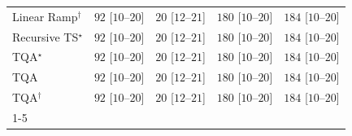 \begin{tabular}{l|cccc|}
Linear Ramp$^\dagger$ & {\cellcolor[HTML]{75C477}} \color[HTML]{000000} $92$ [$10$--$20$] & {\cellcolor[HTML]{E8F6E4}} \color[HTML]{000000} $20$ [$12$--$21$] & {\cellcolor[HTML]{004A1E}} \color[HTML]{F1F1F1} $180$ [$10$--$20$] & {\cellcolor[HTML]{00441B}} \color[HTML]{F1F1F1} $184$ [$10$--$20$] \\
Recursive TS$^\star$ & {\cellcolor[HTML]{75C477}} \color[HTML]{000000} $92$ [$10$--$20$] & {\cellcolor[HTML]{E8F6E4}} \color[HTML]{000000} $20$ [$12$--$21$] & {\cellcolor[HTML]{004A1E}} \color[HTML]{F1F1F1} $180$ [$10$--$20$] & {\cellcolor[HTML]{00441B}} \color[HTML]{F1F1F1} $184$ [$10$--$20$] \\
TQA$^\star$ & {\cellcolor[HTML]{75C477}} \color[HTML]{000000} $92$ [$10$--$20$] & {\cellcolor[HTML]{E8F6E4}} \color[HTML]{000000} $20$ [$12$--$21$] & {\cellcolor[HTML]{004A1E}} \color[HTML]{F1F1F1} $180$ [$10$--$20$] & {\cellcolor[HTML]{00441B}} \color[HTML]{F1F1F1} $184$ [$10$--$20$] \\
TQA & {\cellcolor[HTML]{75C477}} \color[HTML]{000000} $92$ [$10$--$20$] & {\cellcolor[HTML]{E8F6E4}} \color[HTML]{000000} $20$ [$12$--$21$] & {\cellcolor[HTML]{004A1E}} \color[HTML]{F1F1F1} $180$ [$10$--$20$] & {\cellcolor[HTML]{00441B}} \color[HTML]{F1F1F1} $184$ [$10$--$20$] \\
TQA$^\dagger$ & {\cellcolor[HTML]{75C477}} \color[HTML]{000000} $92$ [$10$--$20$] & {\cellcolor[HTML]{E8F6E4}} \color[HTML]{000000} $20$ [$12$--$21$] & {\cellcolor[HTML]{004A1E}} \color[HTML]{F1F1F1} $180$ [$10$--$20$] & {\cellcolor[HTML]{00441B}} \color[HTML]{F1F1F1} $184$ [$10$--$20$] \\
\cline{1-5}
\bottomrule
\end{tabular}
